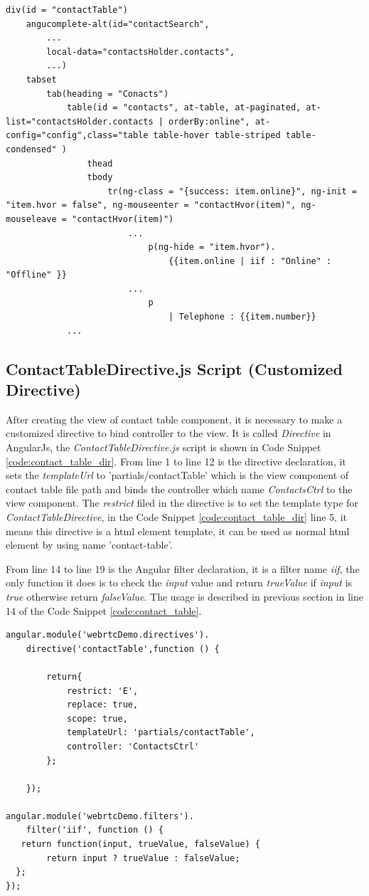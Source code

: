 \begin{lstlisting}[caption={contactTable.jade in application client},label={code:contact_table}]
div(id = "contactTable")
	angucomplete-alt(id="contactSearch",
		...
		local-data="contactsHolder.contacts",
		...)
	tabset
		tab(heading = "Conacts")
			table(id = "contacts", at-table, at-paginated, at-list="contactsHolder.contacts | orderBy:online", at-config="config",class="table table-hover table-striped table-condensed" )
				thead
				tbody
					tr(ng-class = "{success: item.online}", ng-init = "item.hvor = false", ng-mouseenter = "contactHvor(item)", ng-mouseleave = "contactHvor(item)")
						...
							p(ng-hide = "item.hvor").
								{{item.online | iif : "Online" : "Offline" }}
                        ...
							p
								| Telephone : {{item.number}}
			...
\end{lstlisting}

\subsection{ContactTableDirective.js Script (Customized Directive)}

\par After creating the view of contact table component, it is necessary to make a customized directive to bind controller to the view. It is called \textit{Directive} in AngularJs, the \textit{ContactTableDirective.js} script is shown in Code Snippet \ref{code:contact_table_dir}. From line 1 to line 12 is the directive declaration, it sets the \textit{templateUrl} to 'partials/contactTable' which is the view component of contact table file path and binds the controller which name \textit{ContactsCtrl} to the view component. The \textit{restrict} filed in the directive is to set the template type for \textit{ContactTableDirective}, in the Code Snippet \ref{code:contact_table_dir} line 5, it means this directive is a \gls{html} element template, it can be used as normal \gls{html} element by using name 'contact-table'.

\par From line 14 to line 19 is the Angular filter declaration, it is a filter name \textit{iif}, the only function it does is to check the \textit{input} value and return \textit{trueValue} if \textit{input} is \textit{true} otherwise return \textit{falseValue}. The usage is described in previous section in line 14 of the Code Snippet \ref{code:contact_table}.

\begin{lstlisting}[caption={ContactTableDirective.js in application client},label={code:contact_table_dir}]
angular.module('webrtcDemo.directives').
	directive('contactTable',function () {

		return{
			restrict: 'E',
			replace: true,
			scope: true,
			templateUrl: 'partials/contactTable',
			controller: 'ContactsCtrl'
		};

	});

angular.module('webrtcDemo.filters').
	filter('iif', function () {
   return function(input, trueValue, falseValue) {
        return input ? trueValue : falseValue;
  };
});
\end{lstlisting}

